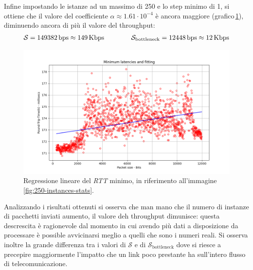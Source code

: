 \FloatBarrier\noindent Infine impostando le istanze ad un massimo di 250 e lo step minimo di 1, si ottiene che il valore del coefficiente $\alpha \approx 1.61 \cdot 10^{-4}$ è ancora maggiore (grafico\,\ref{fig:250-instances-min}), diminuendo ancora di più il valore del throughput:
\begin{gather*}
    \mathcal{S} = 149382\,\text{bps} \approx  149\,\text{Kbps}  \hspace{40px} \mathcal{S}_{\text{bottleneck}} = 12448\,\text{bps} \approx  12\,\text{Kbps}
\end{gather*}

\begin{figure}[h]
    \centering
    \includegraphics[width = .8\textwidth]{hw-2/report/imgs/250-instances/la-min-latencies.png}
    \caption{Regressione lineare del \textsl{RTT} minimo, in riferimento all'immagine\,\ref{fig:250-instances-stats}.}
    \label{fig:250-instances-min}
\end{figure}

\FloatBarrier\noindent Analizzando i risultati ottenuti si osserva che man mano che il numero di instanze di pacchetti inviati aumento, il valore deh throughput dimunisce: questa descrescita è ragionevole dal momento in cui avendo più dati a disposizione da processare è possible avvicinarsi meglio a quelli che sono i numeri reali. Si osserva inoltre la grande differenza tra i valori di $\mathcal{S}$ e di $\mathcal{S}_{\text{bottleneck}}$ dove si riesce a precepire maggiormente l'impatto che un link poco prestante ha sull'intero flusso di telecomunicazione. 


